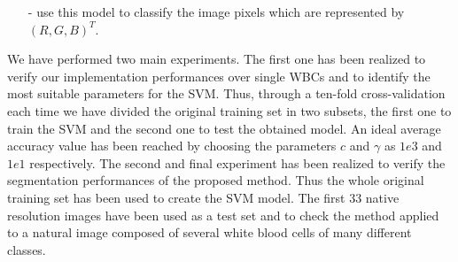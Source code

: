 \documentclass[final,a4paper,12pt,english]{UnicaPhdThesis3}
\begin{document}
{\begin{itemize}
	\item[-] use this model to classify the image pixels which are represented by $(R,G,B)^T.$
\end{itemize}    
We have performed two main experiments. The first one has been realized to verify our implementation performances over single WBCs and to identify the most suitable parameters for the SVM. Thus, through a ten-fold cross-validation each time we have divided the original training set in two subsets, the first one to train the SVM and the second one to test the obtained model. An ideal average accuracy value has been reached by choosing the parameters $c$ and $\gamma$ as $1e3$ and $1e1$ respectively. 
The second and final experiment has been realized to verify the segmentation performances of the proposed method. Thus the whole original training set has been used to create the SVM model. The first 33 native resolution images have been used as a test set and to check the method applied to a natural image composed of several white blood cells of many different classes. 

}
\end{document}
